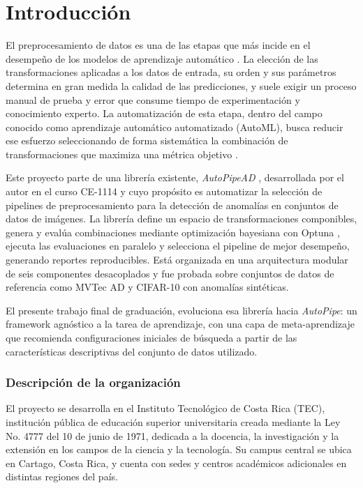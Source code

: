 \documentclass[12pt,letterpaper,oneside]{article}
\begin{document}
\clearpage

\section{Introducción}
\label{sec:introduccion}

El preprocesamiento de datos es una de las etapas que más incide en el desempeño de
los modelos de aprendizaje automático \cite{garcia2015preprocessing}. La elección de
las transformaciones aplicadas a los datos de entrada, su orden y sus parámetros
determina en gran medida la calidad de las predicciones, y suele exigir un proceso
manual de prueba y error que consume tiempo de experimentación y conocimiento experto.
La automatización de esta etapa, dentro del campo conocido como aprendizaje automático
automatizado (AutoML), busca reducir ese esfuerzo seleccionando de forma sistemática la
combinación de transformaciones que maximiza una métrica objetivo
\cite{hutter2019automl, feurer2015autosklearn}.

Este proyecto parte de una librería existente, \textit{AutoPipeAD}
\cite{borbon2026autopipead}, desarrollada por el autor en el curso CE-1114 y cuyo
propósito es automatizar la selección de pipelines de preprocesamiento para la
detección de anomalías en conjuntos de datos de imágenes. La librería define un espacio
de transformaciones componibles, genera y evalúa combinaciones mediante optimización
bayesiana con Optuna \cite{akiba2019optuna}, ejecuta las evaluaciones en paralelo y
selecciona el pipeline de mejor desempeño, generando reportes reproducibles. Está
organizada en una arquitectura modular de seis componentes desacoplados y fue probada
sobre conjuntos de datos de referencia como MVTec AD \cite{bergmann2019mvtec} y
CIFAR-10 \cite{krizhevsky2009cifar} con anomalías sintéticas.

El presente trabajo final de graduación, evoluciona esa librería hacia
\textit{AutoPipe}: un framework agnóstico a la tarea de aprendizaje, con una capa de
meta-aprendizaje que recomienda configuraciones iniciales de búsqueda a partir de las
características descriptivas del conjunto de datos utilizado.

\subsubsection{Descripción de la organización}

El proyecto se desarrolla en el Instituto Tecnológico de Costa Rica (TEC), institución
pública de educación superior universitaria creada mediante la Ley No. 4777 del 10 de
junio de 1971, dedicada a la docencia, la investigación y la extensión en los campos de
la ciencia y la tecnología. Su campus central se ubica en Cartago, Costa Rica, y cuenta
con sedes y centros académicos adicionales en distintas regiones del país.
\end{document}
